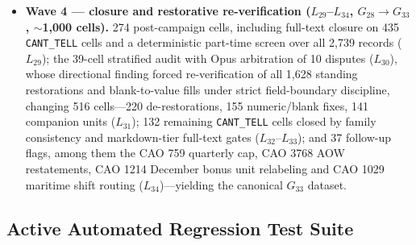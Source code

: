\begin{itemize}[leftmargin=1.5em]
  \item \textbf{Wave 4 --- closure and restorative re-verification ($L_{29}$--$L_{34}$, $G_{28} \rightarrow G_{33}$, $\sim$1,000 cells).} 274 post-campaign cells, including full-text closure on 435 \texttt{CANT\_TELL} cells and a deterministic part-time screen over all 2,739 records ($L_{29}$); the 39-cell stratified audit with Opus arbitration of 10 disputes ($L_{30}$), whose directional finding forced re-verification of all 1,628 standing restorations and blank-to-value fills under strict field-boundary discipline, changing 516 cells---220 de-restorations, 155 numeric/blank fixes, 141 companion units ($L_{31}$); 132 remaining \texttt{CANT\_TELL} cells closed by family consistency and markdown-tier full-text gates ($L_{32}$--$L_{33}$); and 37 follow-up flags, among them the CAO 759 quarterly cap, CAO 3768 AOW restatements, CAO 1214 December bonus unit relabeling and CAO 1029 maritime shift routing ($L_{34}$)---yielding the canonical $G_{33}$ dataset.
\end{itemize}

\subsection{Active Automated Regression Test Suite}
\label{subsec:regression-suite}


